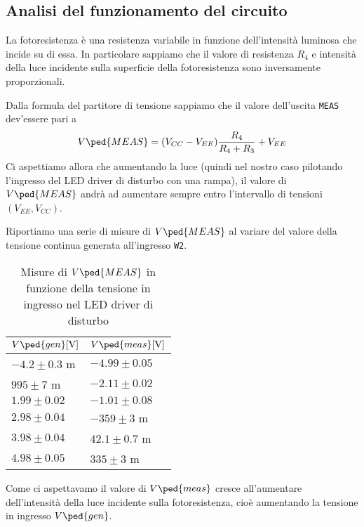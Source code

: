 \documentclass[10pt, a4paper, italian]{article}
\begin{document}
\subsection{Analisi del funzionamento del circuito}
La fotoresistenza è una resistenza variabile in funzione dell'intensità
luminosa che incide su di essa. In particolare sappiamo che il valore di
resistenza $R_4$ e intensità della luce incidente sulla superficie della
fotoresistenza sono inversamente proporzionali.

Dalla formula del partitore di tensione sappiamo che il valore dell'uscita
\verb+MEAS+ dev'essere pari a
\begin{equation}
V\ped{MEAS} = (V_{CC} -  V_{EE})\frac{R_4}{R_4 + R_3} + V_{EE}
\end{equation}
Ci aspettiamo allora che aumentando la luce (quindi nel nostro caso pilotando
l'ingresso del LED driver di disturbo con una rampa), il valore di
$V\ped{MEAS}$ andrà ad aumentare sempre entro l'intervallo di tensioni
$(V_{EE}, V_{CC})$.

Riportiamo una serie di misure di $V\ped{MEAS}$ al variare del valore della
tensione continua generata all'ingresso \verb+W2+.
\begin{table}[htbp]
\centering
\begin{tabular}{@{}ll@{}}
\toprule
$V\ped{gen} [\si{\V}]$ & $V\ped{meas} [\si{\V}]$\\
\midrule
$-4.2 \pm 0.3$ m 	& $ -4.99 \pm 0.05$	\\
$995 \pm 7$ m 	& $ -2.11 \pm 0.02 $	\\
$1.99 \pm 0.02$ 	& $ -1.01 \pm 0.08 $\\
$2.98 \pm 0.04$ 	& $ -359 \pm 3 $ m\\
$3.98 \pm 0.04$ 	& $ 42.1 \pm 0.7 $ m\\
$4.98 \pm 0.05$ 	& $ 335 \pm 3$ m\\
\bottomrule
\end{tabular}
\caption{Misure di $V\ped{MEAS}$ in funzione della tensione in ingresso nel
LED driver di disturbo}
\end{table}
Come ci aspettavamo il valore di $V\ped{meas}$ cresce all'aumentare
dell'intensità della luce incidente sulla fotoresistenza, cioè aumentando la
tensione in ingresso $V\ped{gen}$.

\iffalse
\end{document}
